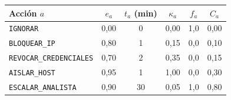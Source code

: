 \begin{tabular}{lccccc}
\toprule
Acción $a$ & $e_a$ & $t_a$ (min) & $\kappa_a$ & $f_a$ & $C_a$ \\
\midrule
\texttt{IGNORAR} & 0,00 & 0 & 0,00 & 1,0 & 0,00 \\
\texttt{BLOQUEAR\_IP} & 0,80 & 1 & 0,15 & 0,0 & 0,10 \\
\texttt{REVOCAR\_CREDENCIALES} & 0,70 & 2 & 0,35 & 0,0 & 0,15 \\
\texttt{AISLAR\_HOST} & 0,95 & 1 & 1,00 & 0,0 & 0,30 \\
\texttt{ESCALAR\_ANALISTA} & 0,90 & 30 & 0,05 & 1,0 & 0,80 \\
\bottomrule
\end{tabular}
